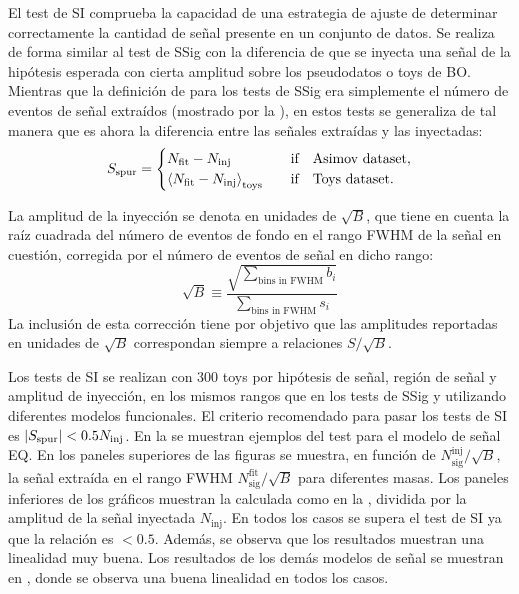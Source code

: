 El test de \acf{SI} comprueba la capacidad de una estrategia de ajuste de determinar correctamente la cantidad de señal presente en un conjunto de datos. Se realiza de forma similar al test de \ac{SSig} con la diferencia de que se inyecta una señal de la hipótesis esperada con cierta amplitud sobre los pseudodatos o toys de \ac{BO}. Mientras que la definición de \sspur para los tests de \ac{SSig} era simplemente el número de eventos de señal extraídos (mostrado por la \Eqn{\ref{eq:bkg:modeling:sigbkg:sstest:sspur_definition_sstest}}), en estos tests se generaliza de tal manera que \sspur es ahora la diferencia entre las señales extraídas y las inyectadas:
\begin{equation}
    \label{eq:bkg:modeling:sigbkg:sitest:sspur_definition}
    \sspur = 
    \begin{cases}
        N_{\text{fit}} - N_{\text{inj}} & \qif \text{Asimov dataset},\\
        \expval{N_{\text{fit}} - N_{\text{inj}}}_{\text{toys}} & \qif \text{Toys dataset}.
    \end{cases}
\end{equation}

La amplitud de la inyección se denota en unidades de \(\sqrt{B}\), que tiene en cuenta la raíz cuadrada del número de eventos de fondo en el rango \ac{FWHM} de la señal en cuestión, corregida por el número de eventos de señal en dicho rango:
\begin{equation*}
    \sqrt{B} \equiv \frac{
        \displaystyle
        \sqrt{\sum_{\text{bins in FWHM}} b_i}
        }{
        \displaystyle
        \sum_{\text{bins in FWHM}} s_i 
    }
\end{equation*}
La inclusión de esta corrección tiene por objetivo que las amplitudes reportadas en unidades de \(\sqrt{B}\) correspondan siempre a relaciones \(S / \sqrt{B}\).

Los tests de \ac{SI} se realizan con 300 toys por hipótesis de señal, región de señal y amplitud de inyección, en los mismos rangos que en los tests de \ac{SSig} y utilizando diferentes modelos funcionales. El criterio recomendado para pasar los tests de \ac{SI} es \(|S_{\text{spur}}| < 0.5 N_{\text{inj}}\). En la \Fig{\ref{fig:bkg:modeling:sigbkg:sitest:siginj_qstar}} se muestran ejemplos del test para el modelo de señal \ac{EQ}. En los paneles superiores de las figuras se muestra, en función de \(N_{\text{sig}}^{\text{inj}} / \sqrt{B}\), la señal extraída en el rango \ac{FWHM} \(N_{\text{sig}}^{\text{fit}} / \sqrt{B}\) para diferentes masas. Los paneles inferiores de los gráficos muestran la \sspur calculada como en la \Eqn{\ref{eq:bkg:modeling:sigbkg:sitest:sspur_definition}}, dividida por la amplitud de la señal inyectada \(N_{\text{inj}}\). En todos los casos se supera el test de \ac{SI} ya que la relación es \(<0.5\). Además, se observa que los resultados muestran una linealidad muy buena. Los resultados de los demás modelos de señal se muestran en \App{\ref{app:si_results}}, donde se observa una buena linealidad en todos los casos.

